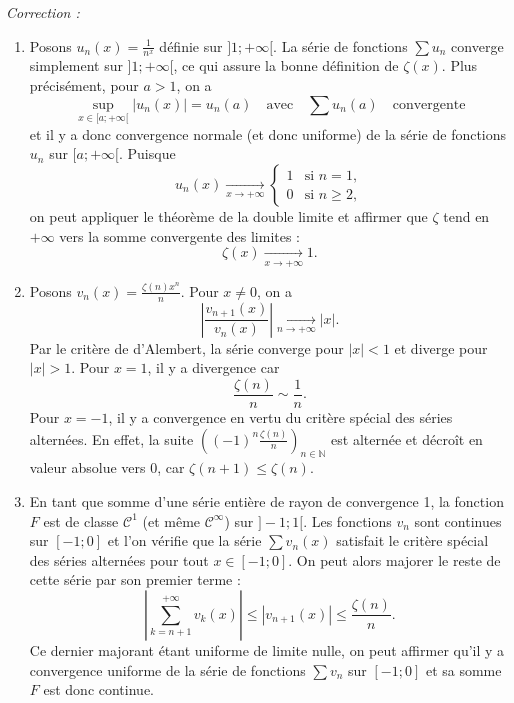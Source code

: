 \documentclass[11pt,a4paper]{article}
\begin{document}
\textit{Correction :} \\
\begin{enumerate}

\item Posons $u_n(x) = \displaystyle \frac{1}{n^x}$ définie sur $]1;+\infty[$. La série de fonctions $\displaystyle \sum u_n$ converge simplement sur $]1;+\infty[$, ce qui assure la bonne définition de $\zeta(x)$. Plus précisément, pour $a > 1$, on a
\[
\sup_{x \in [a;+\infty[} \left|u_n(x)\right| = u_n(a) \quad \text{avec} \quad \sum u_n(a) \quad \text{convergente}
\]
et il y a donc convergence normale (et donc uniforme) de la série de fonctions $u_n$ sur $[a;+\infty[$. Puisque
\[
u_n(x) \xrightarrow[x \to +\infty]{} \begin{cases}
1 & \text{si } n = 1,\\
0 & \text{si } n \ge 2,
\end{cases}
\]
on peut appliquer le théorème de la double limite et affirmer que $\zeta$ tend en $+\infty$ vers la somme convergente des limites :
\[
\zeta(x) \xrightarrow[x \to +\infty]{} 1.
\]
\item Posons $v_n(x) = \displaystyle \frac{\zeta(n) x^n}{n}$. Pour $x \neq 0$, on a
\[
\left|\frac{v_{n+1}(x)}{v_n(x)}\right| \xrightarrow[n \to +\infty]{} \left|x\right|.
\]
Par le critère de d'Alembert, la série converge pour $|x| < 1$ et diverge pour $|x| > 1$. Pour $x = 1$, il y a divergence car
\[
\frac{\zeta(n)}{n} \sim \frac{1}{n}.
\]
Pour $x = -1$, il y a convergence en vertu du critère spécial des séries alternées. En effet, la suite $\displaystyle \left((-1)^n \frac{\zeta(n)}{n}\right)_{n\in \mathbb{N}}$ est alternée et décroît en valeur absolue vers 0, car $\zeta(n+1) \leq \zeta(n)$. \\

\item En tant que somme d'une série entière de rayon de convergence 1, la fonction $F$ est de classe $\mathcal{C}^1$ (et même $\mathcal{C}^\infty$) sur $]-1;1[$. Les fonctions $v_n$ sont continues sur $[-1;0]$ et l'on vérifie que la série $\sum v_n(x)$ satisfait le critère spécial des séries alternées pour tout $x \in [-1;0]$. On peut alors majorer le reste de cette série par son premier terme :
\[
\left|\sum_{k=n+1}^{+\infty} v_k(x)\right| \leq \left|v_{n+1}(x)\right| \leq \frac{\zeta(n)}{n}.
\]
Ce dernier majorant étant uniforme de limite nulle, on peut affirmer qu'il y a convergence uniforme de la série de fonctions $\sum v_n$ sur $[-1;0]$ et sa somme $F$ est donc continue.


\end{enumerate}
\end{document}
